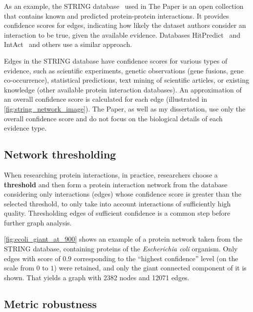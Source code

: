 As an example, the STRING database~\cite{Szklarczyk2019} used in The Paper is an open collection that contains known and predicted protein-protein interactions.
It provides confidence scores for edges, indicating how likely the dataset authors consider an interaction to be true, given the available evidence.
Databases HitPredict~\cite{LopezHitPredictVersionComprehensive2015} and IntAct~\cite{OrchardMIntActProjectIntAct2014} and others use a similar approach.

Edges in the STRING database have confidence scores for various types of evidence, such as scientific experiments, genetic observations (gene fusions, gene co-occurrence), statistical predictions, text mining of scientific articles, or existing knowledge (other available protein interaction databases).
An approximation of an overall confidence score is calculated for each edge (illustrated in \autoref{fig:string_network_image}).
The Paper, as well as my dissertation, use only the overall confidence score and do not focus on the biological details of each evidence type.



\subsection{Network thresholding}



When researching protein interactions, in practice, researchers choose a \textbf{threshold} and then form a protein interaction network from the database considering only interactions (edges) whose confidence score is greater than the selected threshold, to only take into account interactions of sufficiently high quality.
Thresholding edges of sufficient confidence is a common step before further graph analysis.

\autoref{fig:ecoli_giant_at_900} shows an example of a protein network taken from the STRING database, containing proteins of the \textit{Escherichia coli} organism.
Only edges with score of $0.9$ corresponding to the ``highest confidence'' level (on the scale from $0$ to $1$) were retained, and only the giant connected component of it is shown.
That yields a graph with 2382 nodes and 12071 edges.


\subsection{Metric robustness}

